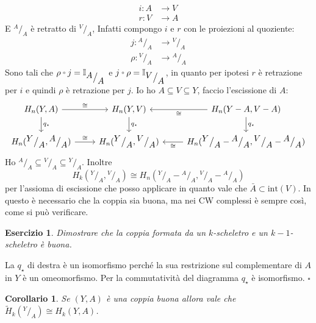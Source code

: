 \documentclass[10pt, twoside=false, x11names]{scrbook}
\newtheorem{corollary}[theorem]{Corollario}
\newcounter{exercises}
\newtheorem{exercise}[exercises]{Esercizio}
\newenvironment{proof}{{\textbf{Dimostrazione}:}}{\hfill $\square$}
\newcommand{\Id}[1][]{\mathbb{I}_#1}
\newcommand*\quot[2]{{^{\textstyle #1}\big/_{\textstyle #2}}}
\let\latexcirc=\circ
\newcommand{\ccirc}{\mathbin{\mathchoice
  {\xcirc\scriptstyle}
  {\xcirc\scriptstyle}
  {\xcirc\scriptscriptstyle}
  {\xcirc\scriptscriptstyle}
}}
\newcommand{\xcirc}[1]{\vcenter{\hbox{$#1\latexcirc$}}}
\let\circ\ccirc
\let\setminus-
\begin{document}
\begin{proof}
\begin{align*}
    i \colon A & \to V \\
    r \colon V & \to A
  \end{align*}
  E $ \quot{A}{A} $ è retratto di $ \quot{V}{A} $,
  Infatti compongo $ i $ e $ r $ con le proiezioni al quoziente:
  \begin{align*}
    j \colon \quot{A}{A} & \to \quot{V}{A} \\
    \rho \colon \quot{V}{A} & \to \quot{A}{A}
  \end{align*}
  Sono tali che $ \rho \circ j = \Id{\quot{A}{A}} $ e $ j \circ \rho = \Id{\quot{V}{A}} $,
  in quanto per ipotesi $ r $ è retrazione per $ i $ e
  quindi $ \rho $ è retrazione per $ j $.
  Io ho $ A \subseteq V \subseteq Y $, faccio l'escissione di $ A $:
  \[
    \begin{tikzcd}
      H_n(Y,A) \rar{\cong} \dar{q_\star} & H_n(Y,V)  \dar{q_\star}& H_n({Y} \setminus {A}, {V} \setminus {A}) \lar{\cong} \dar{q_\star} \\
      H_n(\quot{Y}{A}, \quot{A}{A}) \rar{\cong} & H_n(\quot{Y}{A}, \quot{V}{A}) & H_n(\quot{Y}{A} \setminus \quot{A}{A}, \quot{V}{A} \setminus \quot{A}{A}) \lar{\cong}
    \end{tikzcd}
  \]
  Ho $ \quot{A}{A} \subseteq \quot{V}{A} \subseteq \quot{Y}{A} $.
  Inoltre
  \[
    H_k(\quot{Y}{A}, \quot{V}{A}) \cong H_n(\quot{Y}{A} \setminus \quot{A}{A}, \quot{V}{A} \setminus \quot{A}{A})
  \]
  per l'assioma di escissione che posso applicare in quanto vale che $ \bar{A} \subset \mathrm{int}(V) $.
  In questo è necessario che la coppia sia buona, ma nei CW complessi è sempre così, come si può
  verificare.
  \begin{exercise}
    Dimostrare che la coppia formata da un $ k $-scheletro e un $ k-1 $-scheletro è buona.
  \end{exercise}
  La $ q_\star $ di destra è un isomorfismo perché la sua restrizione sul complementare di $ A $
  in $ Y $ è un omeomorfismo. Per la commutatività del diagramma $ q_\star $ è isomorfismo.
\end{proof}
\begin{corollary}
  Se $ (Y,A) $ è una coppia buona allora vale che $ \tilde{H}_k(\quot{Y}{A}) \cong H_k(Y,A) $.
\end{corollary}
\end{document}
